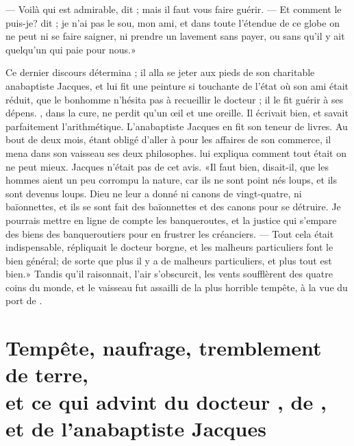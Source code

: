 — Voilà qui est admirable, dit ; mais il faut vous faire guérir.
— Et comment le puis-je? dit ; je n’ai pas le sou, mon ami, et
dans toute l’étendue de ce globe on ne peut ni se faire saigner, ni
prendre un lavement sans payer, ou sans qu’il y ait quelqu’un qui paie
pour nous.»

Ce dernier discours détermina ; il alla se jeter aux pieds de
son charitable anabaptiste Jacques, et lui fit une peinture si
touchante de l’état où son ami était réduit, que le bonhomme n’hésita
pas à recueillir le docteur ; il le fit guérir à ses dépens.
, dans la cure, ne perdit qu’un œil et une oreille. Il
écrivait bien, et savait parfaitement l’arithmétique. L’anabaptiste
Jacques en fit son teneur de livres. Au bout de deux mois, étant obligé
d’aller à  pour les affaires de son commerce, il mena dans son
vaisseau ses deux philosophes.  lui expliqua comment tout était
on ne peut mieux. Jacques n’était pas de cet avis. «Il faut bien,
disait-il, que les hommes aient un peu corrompu la nature, car ils ne
sont point nés loups, et ils sont devenus loups. Dieu ne leur a donné
ni canons de vingt-quatre, ni baïonnettes, et ils se sont fait des
baïonnettes et des canons pour se détruire. Je pourrais mettre en ligne
de compte les banqueroutes, et la justice qui s’empare des biens des
banqueroutiers pour en frustrer les créanciers. — Tout cela était
indispensable, répliquait le docteur borgne, et les malheurs
particuliers font le bien général; de sorte que plus il y a de malheurs
particuliers, et plus tout est bien.» Tandis qu’il raisonnait, l’air
s’obscurcit, les vents soufflèrent des quatre coins du monde, et le
vaisseau fut assailli de la plus horrible tempête, à la vue du port de
.





\chapter[Tempête, naufrage, tremblement de terre…]{Tempête, naufrage, tremblement de terre,\\et ce qui advint du docteur
, de ,\\et de l’anabaptiste Jacques}


